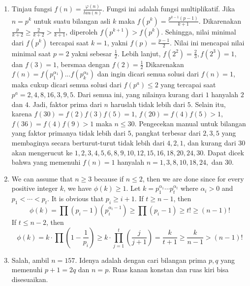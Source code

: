 \documentclass[11pt]{scrartcl}
\begin{document}
\begin{enumerate}
    \item Tinjau fungsi $f(n) = \frac{\varphi(n)}{tau(n)}$. Fungsi ini adalah fungsi multiplikatif. Jika $n = p^k$ untuk suatu bilangan asli $k$ maka $f(p^k) = \frac{p^{k - 1}(p - 1)}{k + 1}$. Dikarenakan $\frac{p}{k + 2} \geq \frac{2}{k + 2} > \frac{1}{k + 1}$, diperoleh $f(p^{k + 1}) > f(p^k)$. Sehingga, nilai minimal dari $f(p^k)$ tercapai saat $k = 1$, yakni $f(p) = \frac{p - 1}{2}$. Nilai ini mencapai nilai minimal saat $p = 2$ yakni sebesar $\frac{1}{2}$. Lebih lanjut, $f(2^2) = \frac{2}{3}, f(2^3) = 1,$ dan $f(3) = 1$, bersmaa dengan $f(2) = \frac{1}{2}$ 
    Dikarenakan $f(n) = f(p_1^{\alpha_1})...f(p_k^{\alpha_k})$ dan ingin dicari semua solusi dari $f(n) = 1$, maka cukup dicari semua solusi dari $f(p^a) \leq 2$ yang tercapai saat $p^a = 2, 4, 8, 16, 3, 9, 5$. Dari semua ini, yang nilainya kurang dari $1$ hanyalah $2$ dan $4$. Jadi, faktor prima dari $n$ haruslah tidak lebih dari $5$. Selain itu, karena $f(30) = f(2)f(3)f(5) = 1$, $f(20) = f(4)f(5) > 1$, $f(36) = f(4)f(9) > 1$ maka $n \leq 30$. Pengecekan manual untuk bilangan yang faktor primanya tidak lebih dari $5$, pangkat terbesar dari $2, 3, 5$ yang membaginya secara berturut-turut tidak lebih dari $4, 2, 1$, dan kurang dari $30$ akan mengerucut ke $1, 2, 3, 4, 5, 6, 8, 9, 10, 12, 15, 16, 18, 20, 24, 30$. Dapat dicek bahwa yang memenuhi $f(n) = 1$ hanyalah $n = 1, 3, 8, 10, 18, 24,$ dan $30$.
    \item We can assume that $n\ge 3$ because if $n\leq 2$, then we are done since for every positive integer $k$, we have $\phi(k)\ge 1$. 
    Let $k=p_1^{\alpha_1}\cdots p_t^{\alpha_t}$ where $\alpha_i>0$ and $p_1<\cdots < p_t$. It is obvious that $p_i\ge i+1$.
    If $t\ge n-1$, then$$\phi{(k)}=\prod{(p_i-1)\left(p_i^{\alpha_i-1}\right)}\ge \prod{(p_i-1)}\ge t!\ge (n-1)!$$
    If $t\leq n-2$, then$$\phi{(k)}=k\cdot \prod{\left(1-\frac 1{p_i}\right)}\ge k\cdot\prod_{j=1}^{t}{\left(\frac{j}{j+1}\right)}=\frac k{t+1}\ge \frac k{n-1}>(n-1)!$$
    \item Salah, ambil $n = 157$. Idenya adalah dengan cari bilangan prima $p, q$ yang memenuhi $p + 1 = 2q$ dan $n = p$. Ruas kanan konstan dan ruas kiri bisa disesuaikan.
\end{enumerate}
\end{document}
